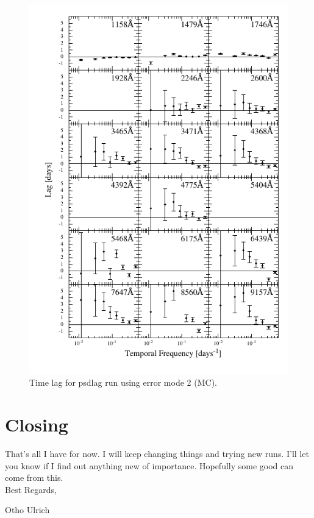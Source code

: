 \documentclass[11pt,letterpaper]{article}
\begin{document}
\begin{figure}
    \label{fig:lag_err2} 
    \centering
    \includegraphics{../img/timelag_atlas_err2.pdf}
    \caption{Time lag for psdlag run using error mode 2 (MC).}
\end{figure}


\section{Closing}
That's all I have for now. I will keep changing things and trying new runs. I'll let you know if I find out anything new of importance. Hopefully some good can come from this.\\

Best Regards,

Otho Ulrich
\end{document}
